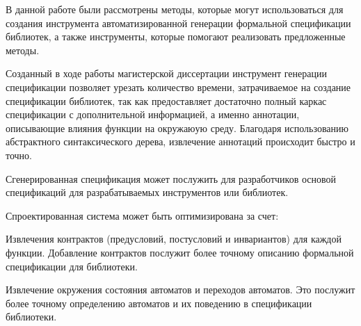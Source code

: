 \conclusion

В данной работе были рассмотрены методы, которые могут использоваться для создания инструмента автоматизированной генерации формальной спецификации библиотек, а также инструменты, которые помогают реализовать предложенные методы.

Созданный в ходе работы магистерской диссертации инструмент генерации спецификации позволяет урезать количество времени, затрачиваемое на создание спецификации библиотек, так как предоставляет достаточно полный каркас спецификации с дополнительной информацией, а именно аннотации, описывающие влияния функции на окружаюую среду.
Благодаря использованию абстрактного синтаксического дерева, извлечение аннотаций происходит быстро и точно.

Сгенерированная спецификация может послужить для разработчиков основой спецификаций для разрабатываемых инструментов или библиотек.

Спроектированная система может быть оптимизирована за счет:
%
\begin{itemize*}
\item Извлечения контрактов (предусловий, постусловий и инвариантов) для каждой функции. Добавление контрактов послужит более точному описанию формальной спецификации для библиотеки.
\item Извлечение окружения состояния автоматов и переходов автоматов. Это послужит более точному определению автоматов и их поведению в спецификации библиотеки.
\end{itemize*}
%